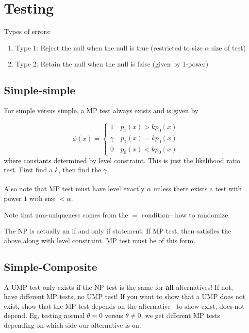 \documentclass{article}
\begin{document}
\newpage
\section{Testing}
Types of errors:
\begin{enumerate}
	\item Type 1: Reject the null when the null is true (restricted to size $\alpha$ size of test)
	\item Type 2: Retain the null when the null is false (given by 1-power)
\end{enumerate}
\subsection{Simple-simple}

\begin{theorem}
For simple versus simple, a MP test always exists and is given by 

$$\phi(x) = \begin{cases}
	1 \quad p_1(x) >kp_0(x)\\
	\gamma \quad p_1(x) = kp_0(x)\\
	0 \quad p_0(x) <kp_0(x)
\end{cases}$$
where constants determined by level constraint. This is just the likelihood ratio test. First find a $k$, then find the $\gamma$. \\\\ Also note that MP test must have level exactly $\alpha$ unless there exists a test with power $1$ with size $<\alpha$. \\
\end{theorem}
Note that non-uniqueness comes from the $=$ condition-- how to randomize. 
\begin{fact}
The NP is actually an if and only if statement. If MP test, then satisfies the above along with level constraint. MP test must be of this form.
\end{fact}
\subsection{Simple-Composite }
A UMP test only exists if the NP test is the same for \textbf{all} alternatives! If not, have different MP tests, no UMP test! If you want to show that a UMP does not exist, show that the MP test depends on the alternative-- to show exist, does not depend. Eg, testing normal $\theta=0$ versus $\theta\neq 0$, we get different MP tests depending on which side our alternative is on. 
\end{document}
